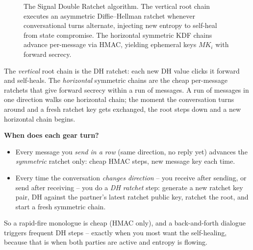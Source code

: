 \begin{figure}[H]
\caption{The Signal Double Ratchet algorithm. The vertical root chain executes an asymmetric Diffie--Hellman
ratchet whenever conversational turns alternate, injecting new entropy to self-heal from state compromise.
The horizontal symmetric KDF chains advance per-message via HMAC, yielding ephemeral keys $MK_i$ with forward secrecy.}
\label{ch27:fig-double-ratchet}
\end{figure}

The \emph{vertical} root chain is the DH ratchet: each new DH value clicks it forward and self-heals. The \emph{horizontal} symmetric chains are the cheap per-message ratchets that give forward secrecy within a run of messages. A run of messages in one direction walks one horizontal chain; the moment the conversation turns around and a fresh ratchet key gets exchanged, the root steps down and a new horizontal chain begins.

\begin{focusbox}
\textbf{When does each gear turn?}
\begin{itemize}
  \item Every message you \emph{send in a row} (same direction, no reply yet) advances the \emph{symmetric} ratchet only: cheap HMAC steps, new message key each time.
  \item Every time the conversation \emph{changes direction} -- you receive after sending, or send after receiving -- you do a \emph{DH ratchet} step: generate a new ratchet key pair, DH against the partner's latest ratchet public key, ratchet the root, and start a fresh symmetric chain.
\end{itemize}
So a rapid-fire monologue is cheap (HMAC only), and a back-and-forth dialogue triggers frequent DH steps -- exactly when you most want the self-healing, because that is when both parties are active and entropy is flowing.
\end{focusbox}


